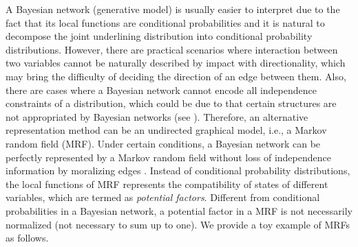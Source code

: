 A Bayesian network (generative model) is usually easier to interpret due to the fact that its local functions are conditional probabilities and it is natural to decompose the joint underlining distribution into conditional probability distributions. However, there are practical scenarios where interaction between two variables cannot be naturally described by impact with directionality, which may bring the difficulty of deciding the direction of an edge between them. Also, there are cases where a Bayesian network cannot encode all independence constraints of a distribution, which could be due to that certain structures are not appropriated by Bayesian networks (see \cite[Section~3.4.2]{koller2009pgm}). Therefore, an alternative representation method can be an undirected graphical model, i.e., a Markov random field (MRF). Under certain conditions, a Bayesian network can be perfectly represented by a Markov random field without loss of independence information by moralizing edges \cite[Section~4.5]{koller2009pgm}\cite[Section~8.3.4]{Bishop:2006:PRM:1162264}. Instead of conditional probability distributions, the local functions of MRF represents the compatibility of states of different variables, which are termed as \textit{potential factors}. Different from conditional probabilities in a Bayesian network, a potential factor in a MRF is not necessarily normalized (not necessary to sum up to one). We provide a toy example of MRFs as follows.
